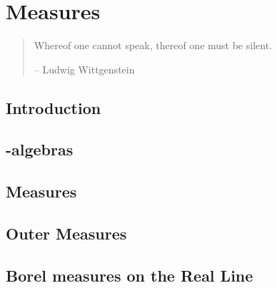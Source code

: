 \chapter{Measures}
\begin{quote}
    Whereof one cannot speak, thereof one must be silent.

    -- Ludwig Wittgenstein
\end{quote}

\section{Introduction}

\section{\textsigma -algebras}

\section{Measures}

\section{Outer Measures}

\section{Borel measures on the Real Line}
